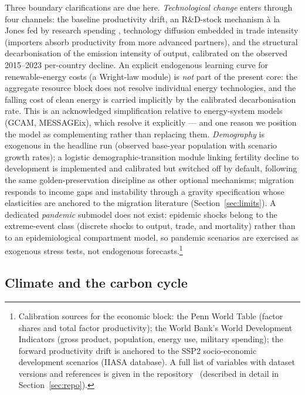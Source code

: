 \documentclass[a4paper,fleqn]{cas-sc}
\begin{document}
Three boundary clarifications are due here. \emph{Technological change} enters through four
channels: the baseline productivity drift, an R\&D-stock mechanism \`a la Jones fed by research
spending \citep{jones1995}, technology diffusion embedded in trade intensity (importers absorb
productivity from more advanced partners), and the structural decarbonisation of the emission
intensity of output, calibrated on the observed 2015--2023 per-country decline. An explicit
endogenous learning curve for renewable-energy costs (a Wright-law module) is \emph{not} part of
the present core: the aggregate resource block does not resolve individual energy technologies,
and the falling cost of clean energy is carried implicitly by the calibrated decarbonisation
rate. This is an acknowledged simplification relative to energy-system models (GCAM, MESSAGEix),
which resolve it explicitly --- and one reason we position the model as complementing rather than
replacing them. \emph{Demography} is exogenous in the headline run (observed base-year population
with scenario growth rates); a logistic demographic-transition module linking fertility decline to
development is implemented and calibrated but switched off by default, following the same
golden-preservation discipline as other optional mechanisms; migration responds to income gaps and
instability through a gravity specification whose elasticities are anchored to the migration
literature (Section~\ref{sec:limits}). A dedicated \emph{pandemic} submodel does not exist:
epidemic shocks belong to the extreme-event class (discrete shocks to output, trade, and
mortality) rather than to an epidemiological compartment model, so pandemic scenarios are
exercised as exogenous stress tests, not endogenous forecasts.\footnote{Calibration sources for the economic
block: the Penn World Table (factor shares and total factor productivity); the World Bank's World
Development Indicators (gross product, population, energy use, military spending); the forward
productivity drift is anchored to the SSP2 socio-economic development scenarios (IIASA database). A
full list of variables with dataset versions and references is given in the repository~\citep{theclimateguy2026gim} (described in detail in Section~\ref{sec:repo}).}


\subsection{Climate and the carbon cycle}
\end{document}
